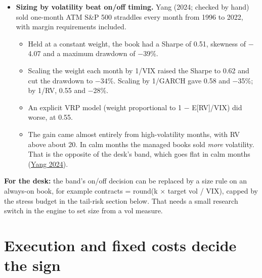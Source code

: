 \documentclass{article}
\begin{document}
\begin{itemize}
\item \textbf{Sizing by volatility beat on/\allowbreak{}off timing.} Yang (2024; checked by hand) sold one-month ATM S\&P 500 straddles every month from 1996 to 2022, with margin requirements included.

\begin{itemize}

\item Held at a constant weight, the book had a Sharpe of 0.51, skewness of \ensuremath{-}4.07 and a maximum drawdown of \ensuremath{-}39\%.

\item Scaling the weight each month by 1/\allowbreak{}VIX raised the Sharpe to 0.62 and cut the drawdown to \ensuremath{-}34\%. Scaling by 1/\allowbreak{}GARCH gave 0.58 and \ensuremath{-}35\%; by 1/\allowbreak{}RV, 0.55 and \ensuremath{-}28\%.

\item An explicit VRP model (weight proportional to 1 \ensuremath{-} E[RV]/\allowbreak{}VIX) did worse, at 0.55.

\item The gain came almost entirely from high-volatility months, with RV above about 20. In calm months the managed books sold \emph{more} volatility. That is the opposite of the desk's band, which goes flat in calm months (\href{https://english.phbs.pku.edu.cn/uploadfile/2024/0530/20240530092144610.pdf}{Yang 2024}).

\end{itemize}

\end{itemize}

\textbf{For the desk:} the band's on/\allowbreak{}off decision can be replaced by a size rule on an always-on book, for example contracts = round(k \ensuremath{\times} target vol /\allowbreak{} VIX), capped by the stress budget in the tail-risk section below. That needs a small research switch in the engine to set size from a vol measure.

\section{Execution and fixed costs decide the sign}
\end{document}
